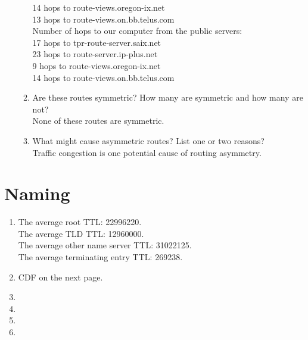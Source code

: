 \documentclass{article}
\begin{document}
\begin{enumerate}
\begin{enumerate}
    14 hops to route-views.oregon-ix.net\\
    13 hops to route-views.on.bb.telus.com\\
    Number of hops to our computer from the public servers:\\
    17 hops to tpr-route-server.saix.net\\
    23 hops to route-server.ip-plus.net\\
    9 hops to route-views.oregon-ix.net\\
    14 hops to route-views.on.bb.telus.com
    \item Are these routes symmetric? How many are symmetric and how many are not?\\
    None of these routes are symmetric.
    \item What might cause asymmetric routes? List one or two reasons? \\
    Traffic congestion is one potential cause of routing asymmetry.
    \end{enumerate}
\end{enumerate}
\section{Naming}
    \begin{enumerate}
        \item
        The average root TTL: 22996220.\\
        The average TLD TTL: 12960000.\\
        The average other name server TTL: 31022125.\\
        The average terminating entry TTL: 269238.
        \item
        CDF on the next page. 
        \item
        \item
        \item
        \item
    
    \end{enumerate}
\end{document}
